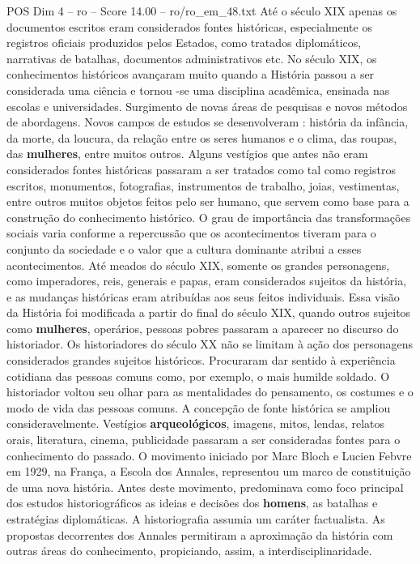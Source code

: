 \begin{textsample}{POS Dim 4 – ro – Score 14.00 – ro/ro\_em\_48.txt}
Até o século XIX apenas os documentos escritos eram considerados fontes históricas, especialmente os registros oficiais produzidos pelos Estados, como tratados diplomáticos, narrativas de batalhas, documentos administrativos etc.
No século XIX, os conhecimentos históricos avançaram muito quando a História passou a ser considerada uma ciência e tornou -se uma disciplina acadêmica, ensinada nas escolas e universidades.
Surgimento de novas áreas de pesquisas e novos métodos de abordagens.
Novos campos de estudos se desenvolveram : história da infância, da morte, da loucura, da relação entre os seres humanos e o clima, das roupas, das \textbf{mulheres}, entre muitos outros.
Alguns vestígios que antes não eram considerados fontes históricas passaram a ser tratados como tal como registros escritos, monumentos, fotografias, instrumentos de trabalho, joias, vestimentas, entre outros muitos objetos feitos pelo ser humano, que servem como base para a construção do conhecimento histórico.
O grau de importância das transformações sociais varia conforme a repercussão que os acontecimentos tiveram para o conjunto da sociedade e o valor que a cultura dominante atribui a esses acontecimentos.
Até meados do século XIX, somente os grandes personagens, como imperadores, reis, generais e papas, eram considerados sujeitos da história, e as mudanças históricas eram atribuídas aos seus feitos individuais.
Essa visão da História foi modificada a partir do final do século XIX, quando outros sujeitos como \textbf{mulheres}, operários, pessoas pobres passaram a aparecer no discurso do historiador.
Os historiadores do século XX não se limitam à ação dos personagens considerados grandes sujeitos históricos.
Procuraram dar sentido à experiência cotidiana das pessoas comuns como, por exemplo, o mais humilde soldado.
O historiador voltou seu olhar para as mentalidades do pensamento, os costumes e o modo de vida das pessoas comuns.
A concepção de fonte histórica se ampliou consideravelmente.
Vestígios \textbf{arqueológicos}, imagens, mitos, lendas, relatos orais, literatura, cinema, publicidade passaram a ser consideradas fontes para o conhecimento do passado.
O movimento iniciado por Marc Bloch e Lucien Febvre em 1929, na França, a Escola dos Annales, representou um marco de constituição de uma nova história.
Antes deste movimento, predominava como foco principal dos estudos historiográficos as ideias e decisões dos \textbf{homens}, as batalhas e estratégias diplomáticas.
A historiografia assumia um caráter factualista.
As propostas decorrentes dos Annales permitiram a aproximação da história com outras áreas do conhecimento, propiciando, assim, a interdisciplinaridade.

\end{textsample}
